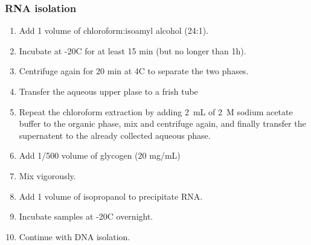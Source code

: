 \subsubsection{RNA isolation}
\begin{enumerate}
\item Add 1 volume of chloroform:isoamyl alcohol (24:1).
\item Incubate at -20\degree C for at least 15 min (but no longer than 1h).
\item Centrifuge again for 20 min at 4\degree C to separate the two phases.
\item Transfer the aqueous upper plase to a frish tube
\item Repeat the chloroform extraction by adding 2~mL of 2~M sodium acetate buffer to the organic phase, mix and centrifuge again, and finally transfer the supernatent to the already collected aqueous phase.
\item Add 1/500 volume of glycogen (20 mg/mL) 
\item Mix vigorously.
\item Add 1 volume of isopropanol to precipitate RNA.
\item Incubate samples at -20\degree C overnight. 
\item Continue with DNA isolation.
\end{enumerate}

